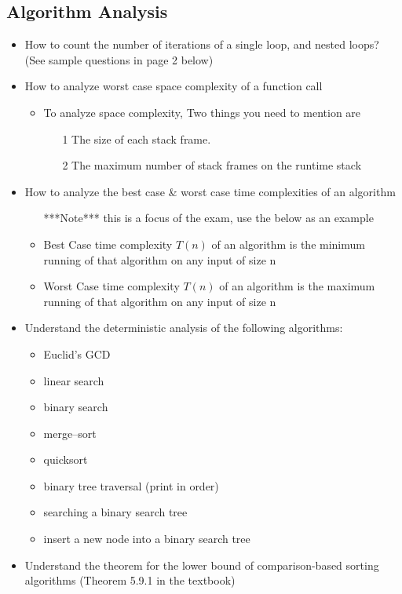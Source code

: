 \subsection{Algorithm Analysis}
  \begin{itemize}
  \item How to count the number of iterations of a single loop, and  nested loops? (See sample questions in page 2 below)
  \item How to analyze worst case space complexity of a function call
    \begin{itemize}
    \item To analyze space complexity, Two things you need to mention are
      \begin{enumerate}
      \item [1] The size of each stack frame.
      \item [2] The maximum number of stack frames on the runtime stack
      \end{enumerate}
    \end{itemize}
  \item How to analyze the best case \& worst case time complexities of an algorithm
    \begin{itemize}
    \item [***Note***] this is a focus of the exam, use the below as an example
    \item Best Case time complexity $T(n)$ of an algorithm is the minimum running of that algorithm on any input of size n
    \item Worst Case time complexity $T(n)$ of an algorithm is the maximum running of that algorithm on any input of size n
    \end{itemize}
  \item Understand the deterministic analysis of the following algorithms:
    \begin{itemize}
    \item Euclid's GCD
    \item linear search
    \item binary search
    \item merge--sort
    \item quicksort
    \item binary tree traversal (print in order)
    \item searching a binary search tree
    \item insert a new node into a binary search tree
    \end{itemize}
  \item Understand the theorem for the lower bound of comparison-based sorting algorithms (Theorem 5.9.1 in the textbook)

\end{itemize}
